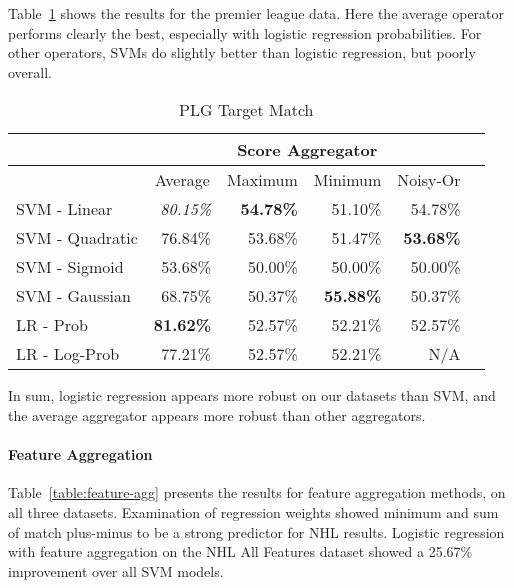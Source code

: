 \documentclass[oribibl]{llncs}%
\begin{document}
Table~\ref{table:score-plg} shows the results for the premier league data. Here the average operator performs clearly the best, especially with logistic regression probabilities. For other operators, SVMs do slightly better than logistic regression, but poorly overall. 

\begin{table}[t]
\caption{PLG Target Match}
\centering
\begin{tabular}{|l|r|r|r|r|r|}
\hline
 & \multicolumn{4}{c|}{Score Aggregator}\\ \hline
 & \multicolumn{ 1}{c|}{Average} & \multicolumn{ 1}{c|}{Maximum} & \multicolumn{1}{c|}{Minimum} &
\multicolumn{ 1}{c|}{Noisy-Or}  \\\hline \cline{ 1- 1}
SVM - Linear & \textit{80.15\%} & \textbf{54.78\%} & 51.10\% & 54.78\% \\ \hline
SVM - Quadratic & 76.84\% & 53.68\% & 51.47\% & \textbf{53.68\%} \\ \hline
SVM - Sigmoid & 53.68\% & 50.00\% & 50.00\% & 50.00\% \\ \hline
SVM - Gaussian & 68.75\% & 50.37\% & \textbf{55.88\%} & 50.37\% \\ \hline
LR - Prob & \textbf{81.62\%} & 52.57\% & 52.21\% & 52.57\% \\ \hline
LR - Log-Prob & 77.21\% & 52.57\% & 52.21\% & N/A \\ \hline
\end{tabular}
\label{table:score-plg}
\end{table}%


In sum, logistic regression appears more robust on our datasets than SVM, and the average aggregator appears more robust than other aggregators. 

\paragraph{Feature Aggregation} 

Table~\ref{table:feature-agg} presents the results for feature aggregation methods, on all three datasets. Examination of regression weights showed minimum and sum of match plus-minus to be a strong predictor for NHL results. Logistic regression with feature aggregation on the NHL All Features dataset showed a 25.67\% improvement over all SVM models.
\end{document}
